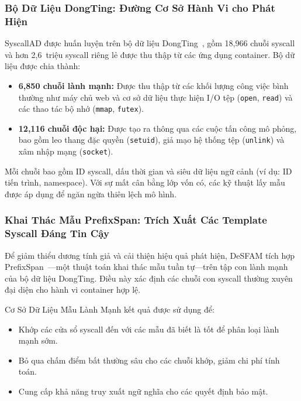 \subsubsection{Bộ Dữ Liệu DongTing: Đường Cơ Sở Hành Vi cho Phát Hiện}
\label{subsubsec:dongting}

SyscallAD được huấn luyện trên bộ dữ liệu DongTing~\cite{ref26_dongtingdataset}, gồm
18,966 chuỗi syscall và hơn 2,6~triệu syscall riêng lẻ được thu thập từ các ứng dụng container.
Bộ dữ liệu được chia thành:

\begin{itemize}
  \item \textbf{6,850 chuỗi lành mạnh:} Được thu thập từ các khối lượng công việc bình thường
        như máy chủ web và cơ sở dữ liệu thực hiện I/O tệp (\texttt{open}, \texttt{read}) và
        các thao tác bộ nhớ (\texttt{mmap}, \texttt{futex}).
  \item \textbf{12,116 chuỗi độc hại:} Được tạo ra thông qua các cuộc tấn công mô phỏng, bao
        gồm leo thang đặc quyền (\texttt{setuid}), giả mạo hệ thống tệp (\texttt{unlink}) và
        xâm nhập mạng (\texttt{socket}).
\end{itemize}

Mỗi chuỗi bao gồm ID syscall, dấu thời gian và siêu dữ liệu ngữ cảnh (ví dụ: ID tiến trình,
namespace). Với sự mất cân bằng lớp vốn có, các kỹ thuật lấy mẫu được áp dụng để ngăn ngừa
thiên lệch mô hình.

\subsubsection{Khai Thác Mẫu PrefixSpan: Trích Xuất Các Template Syscall Đáng Tin Cậy}
\label{subsubsec:prefixspan}

Để giảm thiểu dương tính giả và cải thiện hiệu quả phát hiện, DeSFAM tích hợp
PrefixSpan~\cite{prefixspan_pei}---một thuật toán khai thác mẫu tuần tự---trên tập con lành mạnh
của bộ dữ liệu DongTing. Điều này xác định các chuỗi con syscall thường xuyên đại diện cho hành
vi container hợp lệ.

Cơ Sở Dữ Liệu Mẫu Lành Mạnh kết quả được sử dụng để:
\begin{itemize}
  \item Khớp các cửa sổ syscall đến với các mẫu đã biết là tốt để phân loại lành mạnh sớm.
  \item Bỏ qua chấm điểm bất thường sâu cho các chuỗi khớp, giảm chi phí tính toán.
  \item Cung cấp khả năng truy xuất ngữ nghĩa cho các quyết định bảo mật.
\end{itemize}

